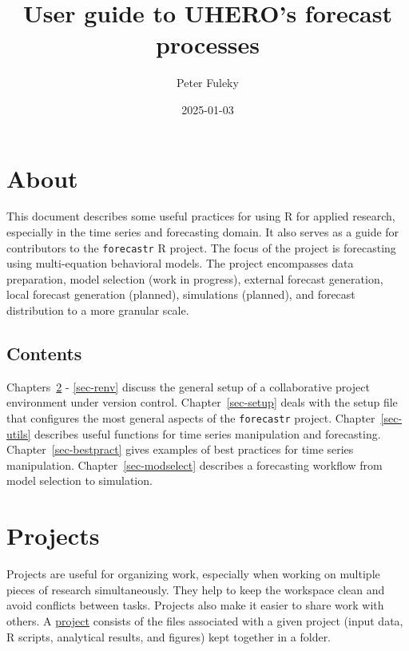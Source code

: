 \documentclass[
  letterpaper,
  DIV=11,
  numbers=noendperiod]{scrreport}
\title{User guide to UHERO's forecast processes}
\author{Peter Fuleky}
\date{2025-01-03}
\renewcommand*\contentsname{Table of contents}
\newcommand\contentsname{Table of contents}
\begin{document}
\maketitle

\renewcommand*\contentsname{Table of contents}
{
\hypersetup{linkcolor=}
\setcounter{tocdepth}{2}
\tableofcontents
}


\chapter{About}\label{about}

This document describes some useful practices for using R for applied
research, especially in the time series and forecasting domain. It also
serves as a guide for contributors to the \texttt{forecastr} R project.
The focus of the project is forecasting using multi-equation behavioral
models. The project encompasses data preparation, model selection (work
in progress), external forecast generation, local forecast generation
(planned), simulations (planned), and forecast distribution to a more
granular scale.

\section{Contents}\label{contents}

Chapters~\ref{sec-projects} - \ref{sec-renv} discuss the general setup
of a collaborative project environment under version control.
Chapter~\ref{sec-setup} deals with the setup file that configures the
most general aspects of the \texttt{forecastr} project.
Chapter~\ref{sec-utils} describes useful functions for time series
manipulation and forecasting. Chapter~\ref{sec-bestpract} gives examples
of best practices for time series manipulation.
Chapter~\ref{sec-modselect} describes a forecasting workflow from model
selection to simulation.


\chapter{Projects}\label{sec-projects}

Projects are useful for organizing work, especially when working on
multiple pieces of research simultaneously. They help to keep the
workspace clean and avoid conflicts between tasks. Projects also make it
easier to share work with others. A
\href{https://support.posit.co/hc/en-us/articles/200526207-Using-RStudio-Projects}{project}
consists of the files associated with a given project (input data, R
scripts, analytical results, and figures) kept together in a folder.
\end{document}
